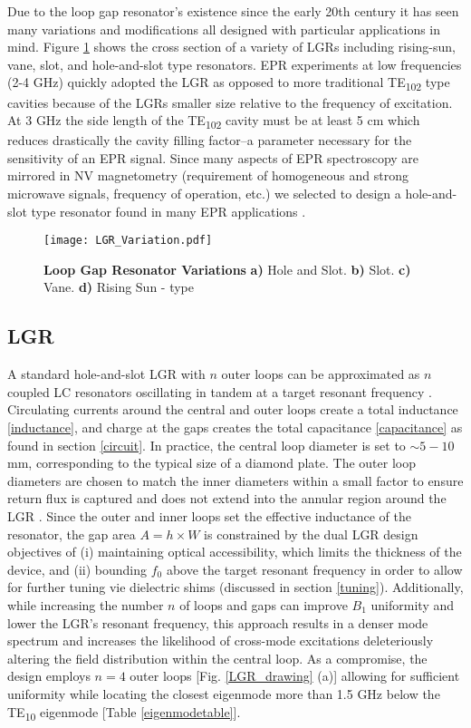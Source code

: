 Due to the loop gap resonator's existence since the early 20th century \cite{collins1948microwave} it has seen many variations and modifications all designed with particular applications in mind. Figure \ref{LGR_variation} shows the cross section of a variety of LGRs including rising-sun, vane, slot, and hole-and-slot type resonators. EPR experiments at low frequencies (2-4 GHz) quickly adopted the LGR as opposed to more traditional TE\textsubscript{102} type cavities because of the LGRs smaller size relative to the frequency of excitation. At 3 GHz the side length of the TE\textsubscript{102} cavity must be at least 5 cm which reduces drastically the cavity filling factor--a parameter necessary for the sensitivity of an EPR signal. Since many aspects of EPR spectroscopy are mirrored in NV magnetometry (requirement of homogeneous and strong microwave signals, frequency of operation, etc.) we selected to design a hole-and-slot type resonator found in many EPR applications \cite{}.  
\vspace{5mm}
\begin{figure}[t!]
\centering
\texttt{[image: LGR\_Variation.pdf]}  
\caption{\textbf{Loop Gap Resonator Variations} \textbf{a)} Hole and Slot. \textbf{b)} Slot. \textbf{c)} Vane. \textbf{d)} Rising Sun - type}
\label{LGR_variation}
\end{figure}


\subsection{LGR}

A standard hole-and-slot LGR with $n$ outer loops can be approximated as $n$ coupled LC resonators oscillating in tandem at a target resonant frequency \cite{wood1984loop}. Circulating currents around the central and outer loops create a total inductance \ref{inductance}, and charge at the gaps creates the total capacitance \ref{capacitance} as found in section \ref{circuit}. In practice, the central loop diameter is set to $\sim 5-10 $ mm, corresponding to the typical size of a diamond plate. The outer loop diameters are chosen to match the inner diameters within a small factor to ensure return flux is captured and does not extend into the annular region around the LGR \cite{}. Since the outer and inner loops set the effective inductance of the resonator, the gap area $A = h \times W$ is constrained by the dual LGR design objectives of (i) maintaining optical accessibility, which limits the thickness of the device, and (ii) bounding $f_0$ above the target resonant frequency in order to allow for further tuning vie dielectric shims (discussed in section \ref{tuning}). Additionally, while increasing the number $n$ of loops and gaps can improve $B_1$ uniformity \cite{piasecki1993field} and lower the LGR's resonant frequency, this approach results in a denser mode spectrum \cite{froncisz1982loop} and increases the likelihood of cross-mode excitations deleteriously altering the field distribution within the central loop. As a compromise, the design employs $n=4$ outer loops [Fig. \ref{LGR_drawing} (a)] allowing for sufficient uniformity while locating the closest eigenmode more than 1.5 GHz below the TE\textsubscript{10} eigenmode [Table \ref{eigenmodetable}].  

